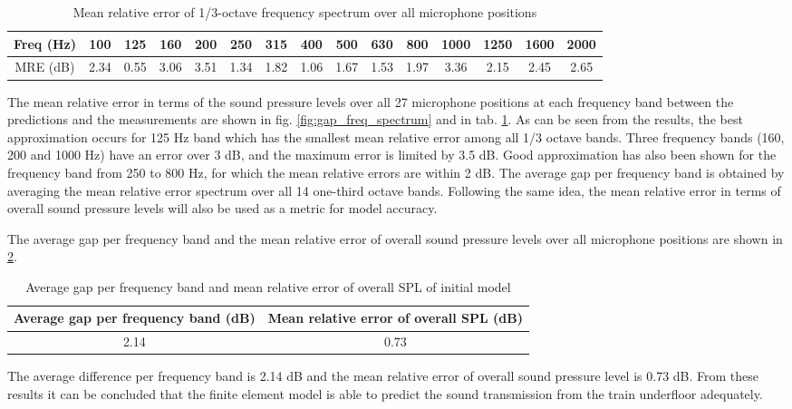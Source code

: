 \begin{table}[H]
	\caption{Mean relative error of 1/3-octave frequency spectrum over all microphone positions}
	\begin{tabular}{c|cccccccccccccc}
		Freq (Hz)           & 100  & 125  & 160  & 200  & 250  & 315  & 400  & 500  & 630  & 800  & 1000 & 1250 & 1600 & 2000 \\ \hline
		MRE (dB) & 2.34 & 0.55 & 3.06 & 3.51 & 1.34 & 1.82 & 1.06 & 1.67 & 1.53 & 1.97 & 3.36 & 2.15 & 2.45 & 2.65
	\end{tabular}
	\label{tab:MRE_spectra}
\end{table}

\noindent The mean relative error in terms of the sound pressure levels over all 27 microphone positions at each frequency band between the predictions and the measurements are shown in fig. \ref{fig:gap_freq_spectrum} and in tab. \ref{tab:MRE_spectra}. As can be seen from the results, the best approximation occurs for 125 Hz band which has the smallest mean relative error among all 1/3 octave bands. Three frequency bands (160, 200 and 1000 Hz) have an error over 3 dB, and the maximum error is limited by 3.5 dB. Good approximation has also been shown for the frequency band from 250 to 800 Hz, for which the mean relative errors are within 2 dB. The average gap per frequency band is obtained by averaging the mean relative error spectrum over all 14 one-third octave bands. Following the same idea, the mean relative error in terms of overall sound pressure levels will also be used as a metric for model accuracy.

The average gap per frequency band and the mean relative error of overall sound pressure levels over all microphone positions are shown in \cref{tab:average_gap}.
\begin{table}[H]
	\centering
	\caption{Average gap per frequency band and mean relative error of overall SPL of initial model}
	\begin{tabular}{c|c}
		Average gap per  frequency band (dB) & Mean relative error of overall SPL (dB) \\ \hline
		2.14 & 0.73
	\end{tabular}
	\label{tab:average_gap}
\end{table}
\noindent The average difference per frequency band is 2.14 dB and the mean relative error of overall sound pressure level is 0.73 dB. From these results it can be concluded that the finite element model is able to predict the sound transmission from the train underfloor adequately.


